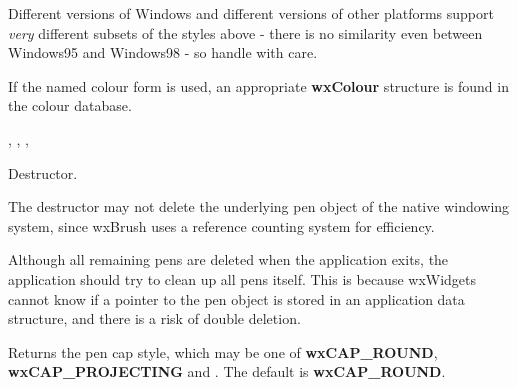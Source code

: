 
Different versions of Windows and different versions of other platforms
support {\it very} different subsets of the styles above - there is no
similarity even between Windows95 and Windows98 - so handle with care.

If the named colour form is used, an appropriate {\bf wxColour} structure
is found in the colour database.


, ,\rtfsp
{}, 




Destructor.


The destructor may not delete the underlying pen object of the native windowing
system, since wxBrush uses a reference counting system for efficiency.

Although all remaining pens are deleted when the application exits,
the application should try to clean up all pens itself. This is because
wxWidgets cannot know if a pointer to the pen object is stored in an
application data structure, and there is a risk of double deletion.

\label{wxpengetcap}


Returns the pen cap style, which may be one of {\bf wxCAP\_ROUND}, {\bf wxCAP\_PROJECTING} and
. The default is {\bf wxCAP\_ROUND}.



\label{wxpengetcolour}

